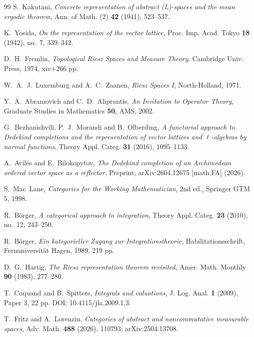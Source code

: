 \begin{thebibliography}{99}
S.~Kakutani,
\textit{Concrete representation of abstract (L)-spaces and the mean ergodic theorem},
Ann. of Math. (2) \textbf{42} (1941), 523--537.

K.~Yosida,
\textit{On the representation of the vector lattice},
Proc. Imp. Acad. Tokyo \textbf{18} (1942), no.~7, 339--342.

D.~H.~Fremlin,
\textit{Topological Riesz Spaces and Measure Theory},
Cambridge Univ. Press, 1974, xiv+266 pp.

W.~A.~J.~Luxemburg and A.~C.~Zaanen,
\textit{Riesz Spaces I},
North-Holland, 1971.

Y.~A.~Abramovich and C.~D.~Aliprantis,
\textit{An Invitation to Operator Theory},
Graduate Studies in Mathematics \textbf{50}, AMS, 2002.

G.~Bezhanishvili, P.~J.~Morandi and B.~Olberding,
\textit{A functorial approach to Dedekind completions and the representation of
vector lattices and $\ell$-algebras by normal functions},
Theory Appl. Categ. \textbf{31} (2016), 1095--1133.

A.~Avil\'{e}s and E.~Bilokopytov,
\textit{The Dedekind completion of an Archimedean ordered vector space as a reflector},
Preprint, arXiv:2604.12675 [math.FA] (2026).


S.~Mac~Lane,
\textit{Categories for the Working Mathematician}, 2nd ed.,
Springer GTM 5, 1998.

R.~B\"{o}rger,
\textit{A categorical approach to integration},
Theory Appl. Categ. \textbf{23} (2010), no.~12, 243--250.

R.~B\"{o}rger,
\textit{Ein kategorieller Zugang zur Integrationstheorie},
Habilitationsschrift, Fernuniversit\"{a}t Hagen, 1989, 219 pp.

D.~G.~Hartig,
\textit{The Riesz representation theorem revisited},
Amer. Math. Monthly \textbf{90} (1983), 277--280.

T.~Coquand and B.~Spitters,
\textit{Integrals and valuations},
J. Log. Anal. \textbf{1} (2009), Paper 3, 22 pp.
DOI: 10.4115/jla.2009.1.3.

T.~Fritz and A.~Lorenzin,
\textit{Categories of abstract and noncommutative measurable spaces},
Adv. Math. \textbf{488} (2026), 110793; arXiv:2504.13708.


\end{thebibliography}
